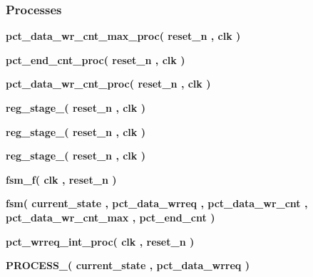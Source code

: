\subsubsection*{Processes}
 \begin{DoxyCompactItemize}
\item 
{\bf pct\+\_\+data\+\_\+wr\+\_\+cnt\+\_\+max\+\_\+proc}{\bfseries  ( {\bfseries {\bfseries {\bf reset\+\_\+n}} \textcolor{vhdlchar}{ }} , {\bfseries {\bfseries {\bf clk}} \textcolor{vhdlchar}{ }} )}
\item 
{\bf pct\+\_\+end\+\_\+cnt\+\_\+proc}{\bfseries  ( {\bfseries {\bfseries {\bf reset\+\_\+n}} \textcolor{vhdlchar}{ }} , {\bfseries {\bfseries {\bf clk}} \textcolor{vhdlchar}{ }} )}
\item 
{\bf pct\+\_\+data\+\_\+wr\+\_\+cnt\+\_\+proc}{\bfseries  ( {\bfseries {\bfseries {\bf reset\+\_\+n}} \textcolor{vhdlchar}{ }} , {\bfseries {\bfseries {\bf clk}} \textcolor{vhdlchar}{ }} )}
\item 
{\bf reg\+\_\+stage\+\_}{\bfseries  ( {\bfseries {\bfseries {\bf reset\+\_\+n}} \textcolor{vhdlchar}{ }} , {\bfseries {\bfseries {\bf clk}} \textcolor{vhdlchar}{ }} )}
\item 
{\bf reg\+\_\+stage\+\_}{\bfseries  ( {\bfseries {\bfseries {\bf reset\+\_\+n}} \textcolor{vhdlchar}{ }} , {\bfseries {\bfseries {\bf clk}} \textcolor{vhdlchar}{ }} )}
\item 
{\bf reg\+\_\+stage\+\_}{\bfseries  ( {\bfseries {\bfseries {\bf reset\+\_\+n}} \textcolor{vhdlchar}{ }} , {\bfseries {\bfseries {\bf clk}} \textcolor{vhdlchar}{ }} )}
\item 
{\bf fsm\+\_\+f}{\bfseries  ( {\bfseries {\bfseries {\bf clk}} \textcolor{vhdlchar}{ }} , {\bfseries {\bfseries {\bf reset\+\_\+n}} \textcolor{vhdlchar}{ }} )}
\item 
{\bf fsm}{\bfseries  ( {\bfseries {\bfseries {\bf current\+\_\+state}} \textcolor{vhdlchar}{ }} , {\bfseries {\bfseries {\bf pct\+\_\+data\+\_\+wrreq}} \textcolor{vhdlchar}{ }} , {\bfseries {\bfseries {\bf pct\+\_\+data\+\_\+wr\+\_\+cnt}} \textcolor{vhdlchar}{ }} , {\bfseries {\bfseries {\bf pct\+\_\+data\+\_\+wr\+\_\+cnt\+\_\+max}} \textcolor{vhdlchar}{ }} , {\bfseries {\bfseries {\bf pct\+\_\+end\+\_\+cnt}} \textcolor{vhdlchar}{ }} )}
\item 
{\bf pct\+\_\+wrreq\+\_\+int\+\_\+proc}{\bfseries  ( {\bfseries {\bfseries {\bf clk}} \textcolor{vhdlchar}{ }} , {\bfseries {\bfseries {\bf reset\+\_\+n}} \textcolor{vhdlchar}{ }} )}
\item 
{\bf P\+R\+O\+C\+E\+S\+S\+\_}{\bfseries  ( {\bfseries {\bfseries {\bf current\+\_\+state}} \textcolor{vhdlchar}{ }} , {\bfseries {\bfseries {\bf pct\+\_\+data\+\_\+wrreq}} \textcolor{vhdlchar}{ }} )}
\end{DoxyCompactItemize}
